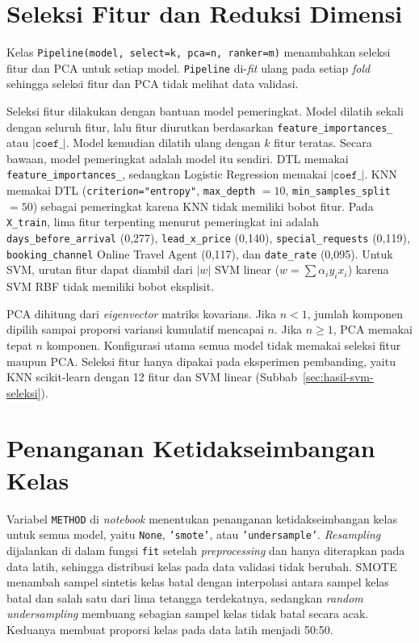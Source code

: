 \section{Seleksi Fitur dan Reduksi Dimensi}
\label{sec:seleksi}

Kelas \texttt{Pipeline(model, select=k, pca=n, ranker=m)} menambahkan seleksi
fitur dan PCA untuk setiap model. \texttt{Pipeline} di-\textit{fit} ulang pada
setiap \textit{fold} sehingga seleksi fitur dan PCA tidak melihat data validasi.

Seleksi fitur dilakukan dengan bantuan model pemeringkat. Model dilatih sekali
dengan seluruh fitur, lalu fitur diurutkan berdasarkan
\texttt{feature\_importances\_} atau $|\texttt{coef\_}|$. Model kemudian dilatih
ulang dengan $k$ fitur teratas. Secara bawaan, model pemeringkat adalah model itu
sendiri. DTL memakai \texttt{feature\_importances\_}, sedangkan Logistic
Regression memakai $|\texttt{coef\_}|$. KNN memakai DTL (\texttt{criterion="entropy"},
\texttt{max\_depth} $=10$, \texttt{min\_samples\_split} $=50$) sebagai
pemeringkat karena KNN tidak memiliki bobot fitur. Pada \texttt{X\_train}, lima
fitur terpenting menurut pemeringkat ini adalah \texttt{days\_before\_arrival}
(0,277), \texttt{lead\_x\_price} (0,140), \texttt{special\_requests} (0,119),
\texttt{booking\_channel} Online Travel Agent (0,117), dan \texttt{date\_rate}
(0,095). Untuk SVM, urutan fitur dapat diambil dari $|w|$ SVM linear
($w=\sum\alpha_i y_i x_i$) karena SVM RBF tidak memiliki bobot eksplisit.

PCA dihitung dari \textit{eigenvector} matriks kovarians. Jika $n<1$, jumlah
komponen dipilih sampai proporsi variansi kumulatif mencapai $n$. Jika $n\ge1$,
PCA memakai tepat $n$ komponen. Konfigurasi utama semua model tidak memakai
seleksi fitur maupun PCA. Seleksi fitur hanya dipakai pada eksperimen pembanding,
yaitu KNN scikit-learn dengan 12 fitur dan SVM linear
(Subbab~\ref{sec:hasil-svm-seleksi}).



\section{Penanganan Ketidakseimbangan Kelas}

Variabel \texttt{METHOD} di \textit{notebook} menentukan penanganan
ketidakseimbangan kelas untuk semua model, yaitu \texttt{None}, \texttt{'smote'},
atau \texttt{'undersample'}. \textit{Resampling} dijalankan di dalam fungsi
\texttt{fit} setelah \textit{preprocessing} dan hanya diterapkan pada data latih,
sehingga distribusi kelas pada data validasi tidak berubah. SMOTE menambah sampel
sintetis kelas batal dengan interpolasi antara sampel kelas batal dan salah satu
dari lima tetangga terdekatnya, sedangkan \textit{random undersampling} membuang
sebagian sampel kelas tidak batal secara acak. Keduanya membuat proporsi kelas
pada data latih menjadi 50:50.

